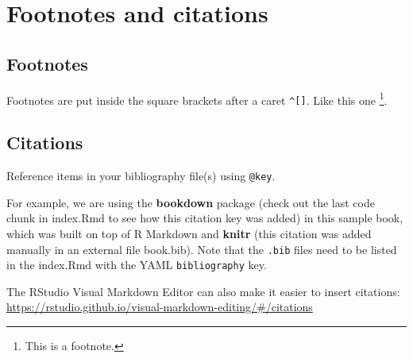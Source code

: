 \documentclass[
]{book}
\begin{document}
\hypertarget{footnotes-and-citations}{%
\chapter{Footnotes and citations}\label{footnotes-and-citations}}

\hypertarget{footnotes}{%
\section{Footnotes}\label{footnotes}}

Footnotes are put inside the square brackets after a caret \texttt{\^{}{[}{]}}. Like this one \footnote{This is a footnote.}.

\hypertarget{citations}{%
\section{Citations}\label{citations}}

Reference items in your bibliography file(s) using \texttt{@key}.

For example, we are using the \textbf{bookdown} package (check out the last code chunk in index.Rmd to see how this citation key was added) in this sample book, which was built on top of R Markdown and \textbf{knitr} \citep{xie2015} (this citation was added manually in an external file book.bib).
Note that the \texttt{.bib} files need to be listed in the index.Rmd with the YAML \texttt{bibliography} key.

The RStudio Visual Markdown Editor can also make it easier to insert citations: \url{https://rstudio.github.io/visual-markdown-editing/\#/citations}

  
\end{document}
